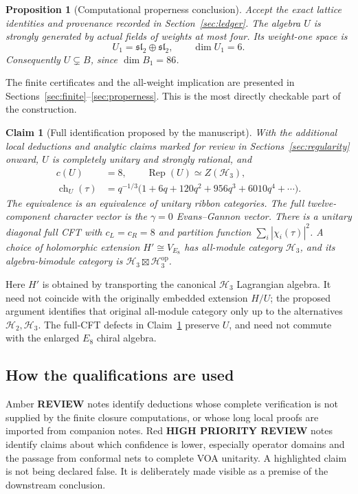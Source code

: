 \documentclass[11pt,a4paper]{article}
\newtheorem{proposition}[theorem]{Proposition}
\newtheorem{claim}[theorem]{Claim}
\theoremstyle{definition}
\DeclareMathOperator{\Rep}{Rep}
\DeclareMathOperator{\ch}{ch}
\newcommand{\HH}{\mathcal H}
\begin{document}
\begin{proposition}[Computational properness conclusion]\label{prop:mainproper}
Accept the exact lattice identities and provenance recorded in
Section~\ref{sec:ledger}. The algebra \(U\) is strongly generated by
actual fields of weights at most four. Its weight-one space is
\[
 U_1=\mathfrak{sl}_2\oplus\mathfrak{sl}_2,\qquad \dim U_1=6.
\]
Consequently \(U\subsetneq B\), since \(\dim B_1=86\).
\end{proposition}
The finite certificates and the all-weight implication are presented in
Sections~\ref{sec:finite}--\ref{sec:properness}. This is the most directly
checkable part of the construction.

\begin{claim}[Full identification proposed by the manuscript]\label{claim:main}
With the additional local deductions and analytic claims marked for
review in Sections~\ref{sec:regularity} onward, \(U\) is completely
unitary and strongly rational, and
\begin{align}
 c(U)&=8,\qquad \Rep(U)\simeq Z(\HH_3),\label{eq:maincat}\\
 \ch_U(\tau)&=q^{-1/3}\bigl(1+6q+120q^2+956q^3+6010q^4+\cdots\bigr).
 \label{eq:vacchar}
\end{align}
The equivalence is an equivalence of unitary ribbon categories.
The full twelve-component character vector is the \(\gamma=0\)
Evans--Gannon vector. There is a unitary diagonal full CFT with
\(c_L=c_R=8\) and partition function
\(\sum_i|\chi_i(\tau)|^2\). A choice of holomorphic extension
\(H'\cong V_{E_8}\) has all-module category \(\HH_3\), and its
algebra-bimodule category is \(\HH_3\boxtimes\HH_3^{\mathrm{op}}\).
\end{claim}

Here \(H'\) is obtained by transporting the canonical \(\HH_3\)
Lagrangian algebra. It need not coincide with the originally embedded
extension \(H/U\); the proposed argument identifies that original
all-module category only up to the alternatives \(\HH_2,\HH_3\).
The full-CFT defects in Claim~\ref{claim:main} preserve \(U\), and need
not commute with the enlarged \(E_8\) chiral algebra.

\subsection{How the qualifications are used}
Amber \textbf{REVIEW} notes identify deductions whose complete verification
is not supplied by the finite closure computations, or whose long local
proofs are imported from companion notes. Red \textbf{HIGH PRIORITY REVIEW}
notes identify claims about which confidence is lower, especially operator
domains and the passage from conformal nets to complete VOA unitarity.
A highlighted claim is not being declared false. It is deliberately made
visible as a premise of the downstream conclusion.
\end{document}
